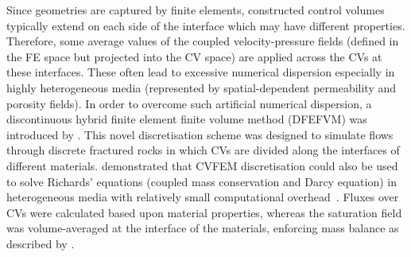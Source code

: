 \documentclass[preprint,authoryear,12pt]{elsarticle}
\newcommand{\KCnote}[1]{\fbox{\parbox{\textwidth}{ \color{black} KC Note $\Rightarrow$ #1}}}
\begin{document}

\medskip
Since geometries are captured by finite elements, constructed control volumes typically extend on each side of the interface which may have different properties. Therefore, some average values of the coupled velocity-pressure fields (defined in the FE space but projected into the CV space) are applied across the CVs at these interfaces. These often lead to excessive numerical dispersion especially in highly heterogeneous media (represented by spatial-dependent permeability and porosity fields). In order to overcome such artificial numerical dispersion, a discontinuous hybrid finite element finite volume method (DFEFVM) was introduced by \citet{nick_2011b, nick_2011a}. This novel discretisation scheme was designed to simulate flows through discrete fractured rocks in which CVs are divided along the interfaces of different materials. \citet{cumming_2011} demonstrated that CVFEM discretisation could also be used to solve Richards' equations (coupled mass conservation and Darcy equation) in heterogeneous media with relatively small computational overhead~\citep[compared with traditional coupled velocity-pressure based formulations, see also][]{cumming_phd2012}. Fluxes over CVs were calculated based upon material properties, whereas the saturation field was volume-averaged at the interface of the materials, enforcing mass balance as described by \citet{kirkland_1992}.

\end{document}
